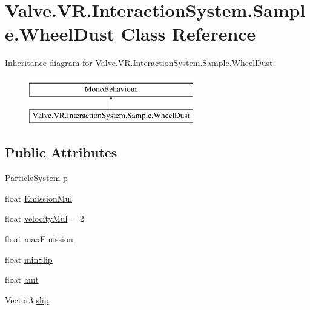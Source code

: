 \hypertarget{class_valve_1_1_v_r_1_1_interaction_system_1_1_sample_1_1_wheel_dust}{}\section{Valve.\+V\+R.\+Interaction\+System.\+Sample.\+Wheel\+Dust Class Reference}
\label{class_valve_1_1_v_r_1_1_interaction_system_1_1_sample_1_1_wheel_dust}
Inheritance diagram for Valve.\+V\+R.\+Interaction\+System.\+Sample.\+Wheel\+Dust\+:\begin{figure}[H]
\begin{center}
\leavevmode
\includegraphics[height=2.000000cm]{class_valve_1_1_v_r_1_1_interaction_system_1_1_sample_1_1_wheel_dust}
\end{center}
\end{figure}
\subsection*{Public Attributes}
\begin{DoxyCompactItemize}
\item 
Particle\+System \mbox{\hyperlink{class_valve_1_1_v_r_1_1_interaction_system_1_1_sample_1_1_wheel_dust_ab27fcdebaf5da4d81be04844e4b47226}{p}}
\item 
float \mbox{\hyperlink{class_valve_1_1_v_r_1_1_interaction_system_1_1_sample_1_1_wheel_dust_ad3d83ad88b6e90397b07c6ce76ca5f0d}{Emission\+Mul}}
\item 
float \mbox{\hyperlink{class_valve_1_1_v_r_1_1_interaction_system_1_1_sample_1_1_wheel_dust_a548fed4a360281ab52ded66d85e26149}{velocity\+Mul}} = 2
\item 
float \mbox{\hyperlink{class_valve_1_1_v_r_1_1_interaction_system_1_1_sample_1_1_wheel_dust_a6857abfe90991780af193ca6690391a3}{max\+Emission}}
\item 
float \mbox{\hyperlink{class_valve_1_1_v_r_1_1_interaction_system_1_1_sample_1_1_wheel_dust_a01d22edd5fb3b290064c3716ce1e3127}{min\+Slip}}
\item 
float \mbox{\hyperlink{class_valve_1_1_v_r_1_1_interaction_system_1_1_sample_1_1_wheel_dust_a83fecc9173f8d35450f8d409be27126c}{amt}}
\item 
Vector3 \mbox{\hyperlink{class_valve_1_1_v_r_1_1_interaction_system_1_1_sample_1_1_wheel_dust_a6e0e15471f7cf36098568d1763519662}{slip}}
\end{DoxyCompactItemize}


